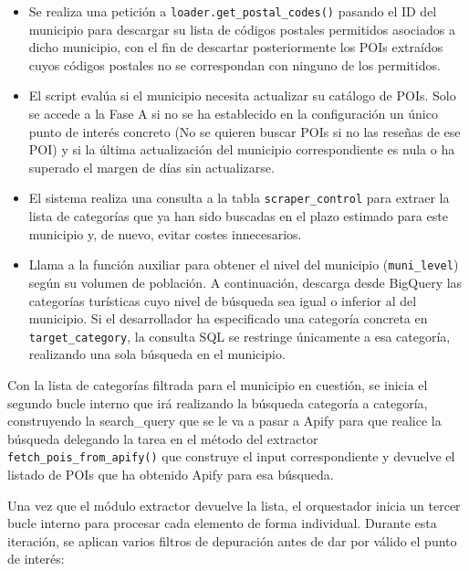 \begin{itemize}
    \item Se realiza una petición a \texttt{loader.get\_postal\_codes()} pasando el ID del municipio para descargar su lista de códigos postales permitidos asociados a dicho municipio, con el fin de descartar posteriormente los POIs extraídos cuyos códigos postales no se correspondan con ninguno de los permitidos.
    \item El script evalúa si el municipio necesita actualizar su catálogo de POIs. Solo se accede a la Fase A si no se ha establecido en la configuración un único punto de interés concreto (No se quieren buscar POIs si no las reseñas de ese POI) y si la última actualización del municipio correspondiente es nula o ha superado el margen de días sin actualizarse.
    \item El sistema realiza una consulta a la tabla \texttt{scraper\_control} para extraer la lista de categorías que ya han sido buscadas en el plazo estimado para este municipio y, de nuevo, evitar costes innecesarios.
    \item Llama a la función auxiliar para obtener el nivel del municipio (\texttt{muni\-\_level}) según su volumen de población. A continuación, descarga desde BigQuery las categorías turísticas cuyo nivel de búsqueda sea igual o inferior al del municipio. Si el desarrollador ha especificado una categoría concreta en \texttt{target\_category}, la consulta SQL se restringe únicamente a esa categoría, realizando una sola búsqueda en el municipio.
\end{itemize}

Con la lista de categorías filtrada para el municipio en cuestión, se inicia el segundo bucle interno que irá realizando la búsqueda categoría a categoría, construyendo la search\_query que se le va a pasar a Apify para que realice la búsqueda delegando la tarea en el método del extractor  \texttt{fetch\_pois\_from\_apify()} que construye el input correspondiente y devuelve el listado de POIs que ha obtenido Apify para esa búsqueda.

Una vez que el módulo extractor devuelve la lista, el orquestador inicia un tercer bucle interno para procesar cada elemento de forma individual. Durante esta iteración, se aplican varios filtros de depuración antes de dar por válido el punto de interés:

